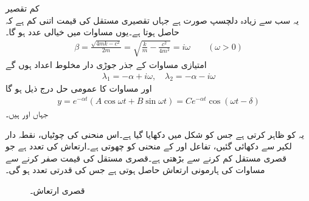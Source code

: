 \quad کم تقصیر\\
یہ سب سے زیادہ دلچسپ صورت ہے جہاں تقصیری مستقل کی قیمت اتنی کم ہے کہ  حاصل ہوتا ہے۔یوں مساوات   میں  خیالی عدد ہو گا۔
\begin{align}\label{مساوات_سادہ_دو_کم_قصری_تعدد}
\beta=\frac{\sqrt{4mk-c^2}}{2m}=\sqrt{\frac{k}{m}-\frac{c^2}{4m^2}}=i\omega \quad\quad  (\omega >0)
\end{align}
امتیازی مساوات کے جذر جوڑی دار مخلوط اعداد ہوں گے
\begin{align}
\lambda_1=-\alpha+i\omega, \quad \lambda_2=-\alpha-i\omega
\end{align} 
اور مساوات  کا عمومی حل درج ذیل ہو گا
\begin{align}\label{مساوات_سادہ_دو_کم_قصری_ارتعاش_الف}
y=e^{-\alpha t} (A \cos \omega t+B \sin \omega t)=C e^{-\alpha t}  \cos (\omega t-\delta)
\end{align}
جہاں  اور  ہیں۔

یہ  کو ظاہر کرتی ہے جس کو شکل  میں دکھایا گیا ہے۔اس منحنی کی چوٹیاں، نقطہ دار لکیر سے دکھائی گئیں، تفاعل  اور  کے منحنی کو چھوتی ہے۔ارتعاش کی تعدد  ہے جو قصری مستقل  کم کرنے سے بڑھتی ہے۔قصری مستقل کی قیمت صفر کرنے سے مساوات  کی ہارمونی ارتعاش حاصل ہوتی ہے جس کی قدرتی تعدد   ہو گی۔
\begin{figure}
\centering
{}
\caption{قصری ارتعاش۔}
\label{شکل_سادہ_دو_درجی_فاصل_قصری_ارتعاش_الف}
\end{figure}

